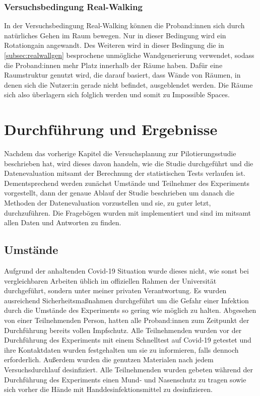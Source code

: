         \subsection{Versuchsbedingung Real-Walking}\label{subsec:realwalk}
            In der Versuchsbedingung Real-Walking können die Proband:innen sich durch natürliches Gehen im Raum bewegen. Nur in dieser Bedingung wird ein Rotationgain angewandt.
            Des Weiteren wird in dieser Bedingung die in \autoref{subsec:realwallgen} besprochene unmögliche Wandgenerierung verwendet, sodass die Proband:innen mehr Platz innerhalb der Räume haben. Dafür eine Raumstruktur genutzt wird, die darauf basiert, dass Wände von Räumen, in denen sich die Nutzer:in gerade nicht befindet, ausgeblendet werden. Die Räume sich also überlagern sich folglich werden und somit zu Impossible Spaces.

\chapter{Durchführung und Ergebnisse}\label{}
    Nachdem das vorherige Kapitel die Versuchsplanung zur Pilotierungsstudie beschrieben hat, wird dieses davon handeln, wie die Studie durchgeführt und die Datenevaluation mitsamt der Berechnung der statistischen Tests verlaufen ist. Dementsprechend werden zunächst Umstände und Teilnehmer des Experiments vorgestellt, dann der genaue Ablauf der Studie beschrieben um danach die Methoden der Datenevaluation vorzustellen und sie, zu guter letzt, durchzuführen. Die Fragebögen wurden mit  implementiert und sind im  mitsamt allen Daten und Antworten zu finden.

    \section{Umstände}\label{sec:circumstances}
        Aufgrund der anhaltenden Covid-19 Situation wurde dieses nicht, wie sonst bei vergleichbaren Arbeiten üblich im offiziellen Rahmen der Universität durchgeführt, sondern unter meiner privaten Verantwortung. Es wurden ausreichend Sicherheitsmaßnahmen durchgeführt um die Gefahr einer Infektion durch die Umstände des Experiments so gering wie möglich zu halten. Abgesehen von einer Teilnehmenden Person, hatten alle Proband:innen zum Zeitpunkt der Durchführung bereits vollen Impfschutz.
        Alle Teilnehmenden wurden vor der Durchführung des Experiments mit einem Schnelltest auf Covid-19 getestet und ihre Kontaktdaten wurden festgehalten um sie zu informieren, falls dennoch erforderlich. Außerdem wurden die genutzen Materialen nach jedem Versuchsdurchlauf desinfiziert.
        Alle Teilnehmenden wurden gebeten während der Durchführung des Experiments einen Mund- und Nasenschutz zu tragen sowie sich vorher die Hände mit Handdesinfektionsmittel zu desinfizieren.

